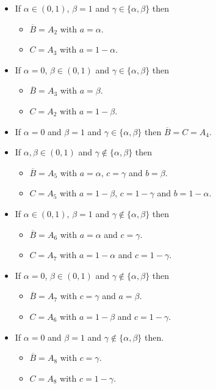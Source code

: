 \begin{corollary}
\begin{itemize}
\begin{itemize}
		\end{itemize}
		\item If $\alpha \in (0,1)$, $\beta=1$ and $\gamma \in \{\alpha, \beta\}$ then 
		\begin{itemize}
			\item $\overline{B} = A_2$ with $a=\alpha$.
			\item $C = A_3$ with $a=1-\alpha$.
		\end{itemize}
		\item If $\alpha=0$, $\beta \in (0,1)$ and $\gamma \in \{\alpha, \beta\}$ then 
		\begin{itemize}
			\item $\overline{B} = A_3$ with $a=\beta$.
			\item $C = A_2$ with $a=1-\beta$.
		\end{itemize}
		\item If $\alpha=0$ and $\beta=1$ and $\gamma \in \{\alpha, \beta\}$ then $\overline{B}=C=A_4$.
		\item If $\alpha, \beta \in (0,1)$ and $\gamma \not\in \{\alpha, \beta\}$ then 
		\begin{itemize}
			\item $\overline{B} = A_5$ with $a=\alpha$, $c=\gamma$ and $b=\beta$.
			\item $C = A_5$ with $a=1-\beta$, $c=1-\gamma$ and $b=1-\alpha$.
		\end{itemize}
		\item If $\alpha \in (0,1)$, $\beta=1$ and $\gamma \not \in \{\alpha, \beta\}$ then 
		\begin{itemize}
			\item $\overline{B} = A_6$ with $a=\alpha$ and $c=\gamma$.
			\item $C = A_7$ with $a=1-\alpha$ and $c=1-\gamma$.
		\end{itemize}
		\item If $\alpha=0$, $\beta \in (0,1)$ and $\gamma \not \in \{\alpha, \beta\}$ then 
		\begin{itemize}
			\item $\overline{B} = A_7$ with $c= \gamma$ and $a=\beta$.
			\item $C = A_6$ with $a=1-\beta$ and $c=1-\gamma$.
		\end{itemize}
		\item If $\alpha=0$ and $\beta=1$ and $\gamma \not \in \{\alpha, \beta\}$ then.
		\begin{itemize}
			\item $\overline{B} = A_8$ with $c= \gamma$.
			\item $C = A_8$ with $c=1-\gamma$. \enlargethispage{20pt}
		\end{itemize}
	\end{itemize}
\end{corollary}

